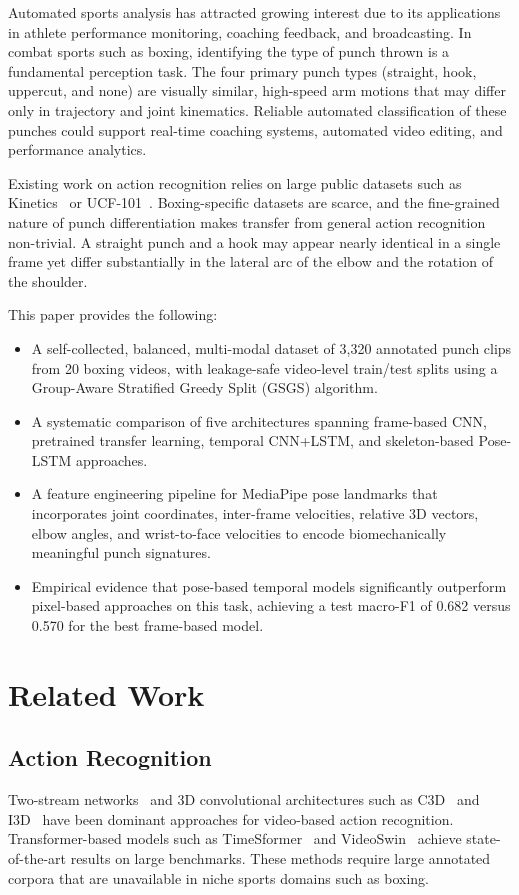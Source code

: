 \documentclass[conference]{IEEEtran}
\begin{document}
Automated sports analysis has attracted growing interest due to its
applications in athlete performance monitoring, coaching feedback, and
broadcasting. In combat sports such as boxing, identifying the type of punch
thrown is a fundamental perception task. The four primary punch types
(straight, hook, uppercut, and none) are visually similar, high-speed arm
motions that may differ only in trajectory and joint kinematics. Reliable
automated classification of these punches could support real-time coaching
systems, automated video editing, and performance analytics.

Existing work on action recognition relies on large public datasets such as
Kinetics~\cite{kay2017kinetics} or UCF-101~\cite{soomro2012ucf101}.
Boxing-specific datasets are scarce, and the fine-grained nature of punch
differentiation makes transfer from general action recognition non-trivial. A
straight punch and a hook may appear nearly identical in a single frame yet
differ substantially in the lateral arc of the elbow and the rotation of the
shoulder.

This paper provides the following:
\begin{itemize}
    \item A self-collected, balanced, multi-modal dataset of 3,320 annotated
    punch clips from 20 boxing videos, with leakage-safe video-level
    train/test splits using a Group-Aware Stratified Greedy Split (GSGS)
    algorithm.
    \item A systematic comparison of five architectures spanning frame-based
    CNN, pretrained transfer learning, temporal CNN+LSTM, and skeleton-based
    Pose-LSTM approaches.
    \item A feature engineering pipeline for MediaPipe pose landmarks that
    incorporates joint coordinates, inter-frame velocities, relative 3D
    vectors, elbow angles, and wrist-to-face velocities to encode
    biomechanically meaningful punch signatures.
    \item Empirical evidence that pose-based temporal models significantly
    outperform pixel-based approaches on this task, achieving a test macro-F1
    of 0.682 versus 0.570 for the best frame-based model.
\end{itemize}

\section{Related Work}

\subsection{Action Recognition}
Two-stream networks~\cite{simonyan2014twostream} and 3D convolutional
architectures such as C3D~\cite{tran2015learning} and
I3D~\cite{carreira2017quo} have been dominant approaches for video-based
action recognition. Transformer-based models such as
TimeSformer~\cite{bertasius2021space} and VideoSwin~\cite{liu2022video}
achieve state-of-the-art results on large benchmarks. These methods require
large annotated corpora that are unavailable in niche sports domains such as
boxing.
\end{document}
